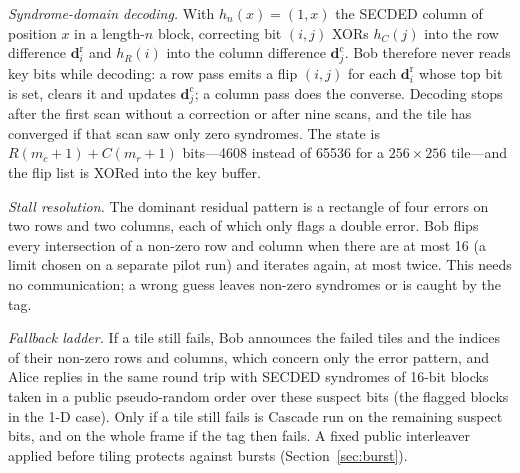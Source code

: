 \documentclass[conference]{IEEEtran}
\begin{document}
\textit{Syndrome-domain decoding.} With $h_n(x)=(1,x)$ the SECDED column of position $x$ in a length-$n$ block, correcting bit $(i,j)$ XORs $h_C(j)$ into the row difference $\mathbf{d}^{\mathrm{r}}_i$ and $h_R(i)$ into the column difference $\mathbf{d}^{\mathrm{c}}_j$. Bob therefore never reads key bits while decoding: a row pass emits a flip $(i,j)$ for each $\mathbf{d}^{\mathrm{r}}_i$ whose top bit is set, clears it and updates $\mathbf{d}^{\mathrm{c}}_j$; a column pass does the converse. Decoding stops after the first scan without a correction or after nine scans, and the tile has converged if that scan saw only zero syndromes. The state is $R(m_c+1)+C(m_r+1)$ bits---4608 instead of 65536 for a $256\times256$ tile---and the flip list is XORed into the key buffer.

\textit{Stall resolution.} The dominant residual pattern is a rectangle of four errors on two rows and two columns, each of which only flags a double error. Bob flips every intersection of a non-zero row and column when there are at most 16 (a limit chosen on a separate pilot run) and iterates again, at most twice. This needs no communication; a wrong guess leaves non-zero syndromes or is caught by the tag.

\textit{Fallback ladder.} If a tile still fails, Bob announces the failed tiles and the indices of their non-zero rows and columns, which concern only the error pattern, and Alice replies in the same round trip with SECDED syndromes of 16-bit blocks taken in a public pseudo-random order over these suspect bits (the flagged blocks in the 1-D case). Only if a tile still fails is Cascade run on the remaining suspect bits, and on the whole frame if the tag then fails. A fixed public interleaver applied before tiling protects against bursts (Section~\ref{sec:burst}).
\end{document}
